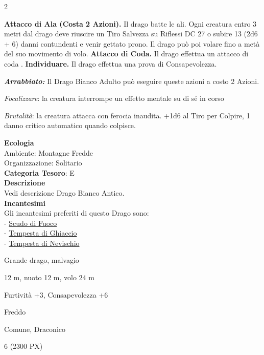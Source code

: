 \begin{multicols}{2}
{\textbf{Attacco di Ala (Costa 2 Azioni).} Il drago batte le ali. Ogni creatura entro 3 metri dal drago deve riuscire un Tiro Salvezza su Riflessi DC 27 o subire 13 (2d6 + 6) danni contundenti e venir gettato prono. Il drago può poi volare fino a metà del suo movimento di volo. \textbf{Attacco di Coda.} Il drago effettua un attacco di coda
.
\textbf{Individuare.} Il drago effettua una prova di Consapevolezza.

\emph{\textbf{Arrabbiato:}} Il Drago Bianco Adulto può eseguire queste azioni a costo 2 Azioni.

\emph{Focalizzare}: la creatura interrompe un effetto mentale su di sé in corso

\emph{Brutalità}: la creatura attacca con ferocia inaudita. +1d6 al Tiro per Colpire, 1 danno critico automatico quando colpisce.

\textbf{Ecologia}\\
Ambiente: Montagne Fredde\\
Organizzazione: Solitario\\
\textbf{Categoria Tesoro}: E\\
\textbf{Descrizione}\\
Vedi descrizione Drago Bianco Antico.\\
\textbf{Incantesimi}\\
Gli incantesimi preferiti di questo Drago sono:\\
- \hyperlink{Scudo di Fuoco}{Scudo di Fuoco}\\
- \hyperlink{Tempesta di Ghiaccio}{Tempesta di Ghiaccio}\\
- \hyperlink{Tempesta di Nevischio}{Tempesta di Nevischio}

\begin{description}[noitemsep, topsep=0pt, parsep=0pt, partopsep=0pt, itemsep=1pt, leftmargin=2.35cm,  labelwidth=2.2cm, itemindent=0cm, listparindent=0pt] %
\setlength{\baselineskip}{10pt}
\item[\textbf{Taglia/Tipo}] Grande drago, malvagio
\item[\textbf{Caratt.}] 
\item[\textbf{Punti Ferita}] 
\item[\textbf{Movimento}] 12 m, nuoto 12 m, volo 24 m
\item[\textbf{Tiri Salvez.}] 
\item[\textbf{Comp.}] Furtività +3, Consapevolezza +6
\item[\textbf{Imm. Danni}] Freddo
\item[\textbf{Sensi}] 
\item[\textbf{Linguaggi}] Comune, Draconico
\item[\textbf{Sfida}] 6 (2300 PX)
\end{description}
\smallskip

}
\end{multicols}
